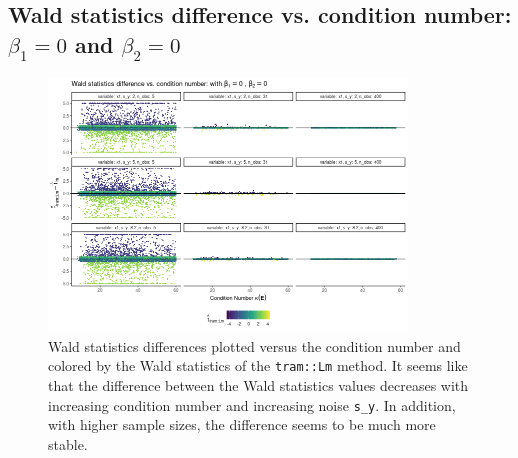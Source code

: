 \documentclass[11pt,a4paper,twoside]{book}\usepackage[]{graphicx}\usepackage[]{xcolor}
\begin{document}
\subsection{Wald statistics difference vs. condition number: $\beta_1=0$ and $\beta_2=0$}
\begin{figure}[H]
\centering
\vspace*{-0.5cm}
\centering
\includegraphics[width=0.85\textwidth]{../fromsim/simana41-1.png}
\vspace*{-0.5cm}
\caption{Wald statistics differences plotted versus the condition number and colored by the Wald statistics of the \texttt{tram::Lm} method. It seems like that the difference between the Wald statistics values decreases with increasing condition number and increasing noise \texttt{s\_y}. In addition, with higher sample sizes, the difference seems to be much more stable.}
\label{fig:simres_differencevscondu2}
\end{figure}


\vspace*{-1cm}
\end{document}
